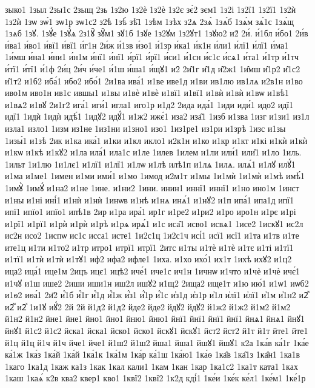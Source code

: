 {зыко1
1зыл
2зы1с
2зыщ
2зь
1з2ю
1з2ѐ
1з2ѐ
1з2є
зє́2
зєм1
1з2і
1з2ї1
1з2ї1
1з2ѝ
1з2ѝ
1зѡ
зѡ́1
зѡ1р
зѡ1с2
з2ѣ
1зѣ̀
зѣ̑1
1зѣм
1зѣх
з2ѧ
2зѧ̀
1зѧ́б
1зѧ́м
зѧ́1с
1зѧ́щ
1зѧб
1зꙋ.
1зꙋ́е
1зꙋ́ѧ
2з1ꙋ̑
зꙋ̑м1
зꙋ1б
1зꙋе
1з2ꙋм
1з2ꙋт1
1зꙋю2
и2́
2и́.
и́1бл
и́бо1
2и́в
и́ва1
и́во1
и́вї1
и́вї1
и́г1н
2и́ж
и́1зв
и́зо1
и́1зр
и́ка1
и́к1н
и́ли1
и́лї1
и́лї1
и́ма1
1и́мш
и́на1
и́ни1
и́н1м
и́нї1
и́нї1
и́рї1
и́рї1
и́си1
и́1сн
и́с1с
и́сѧ1
и́та1
и́1тр
и́1тч
и́тї1
и́тї1
и́1ф
2и́ц
2и́ч
и́че1
и́1ш
и́ша1
и́щꙋ1
и2̑
2и̑1г
и̑1д
и̑2ж1
1и̑мш
и̑1р2
и̑1с2
и̑1т2
и1б2
иба́1
ибо2
ибо́1
2и1ва
ива́1
и1ве
иве1д
и1ви
ив1лю
ив1лѧ
и2в1н
и1во
иво1м
иво1н
ив1с
ившы1
и1вы
и1вѐ
и1вѐ
и1вї1
и1вї1
и1вѝ
и1вѝ
и1вѡ
и1вѣ1
и1вѧ2
и1вꙋ
2и1г2
ига́1
иги́1
игла1
иго1р
и1д2
2ида
ида́1
1иди
иди́1
идо2
идї1
идї1
1идѝ
1идѝ
идѣ́1
1идꙋ2
идꙋ́1
и1ж2
ижє́1
иза2
иза̑1
1изб
и1зва
1изг
и1зи1
из1л
изла1
изло1
1изм
из1не
1из1ни
и1зно1
изо1
1из1ре1
из1ри
и1зрѣ
1изс
и1зы
1изы́1
и1зѣ
2ик
и1ка
ика́1
и1ки
и1кл
икло1
и2к1н
и1ко
и1кр
и1кт
и1кі
и1кѝ
и1кѝ
и1кѡ
и1кѣ
и1кꙋ2
и1ла
ила́1
ила1с
и1ле
1илев
1илем
и1ли
или́1
или̑1
и1ло
1иль.
1ильт
1и1лю
1и1лє1
и1лї1
и1лї1
и1лѡ
и1лѣ
илѣ1п
и1лѧ
1илѧ.
илѧ́1
и1лꙋ
илꙋ́1
и1ма
и1ме1
1имен
и1ми
ими́1
и1мо
1имод
и2м1т
и1мы
1и1мѝ
1и1мѝ
и1мѣ
имѣ́1
1имꙋ̀
1имꙋ́
и1на2
и1не
1ине.
и1ни2
1ини.
инин1
иннї1
иннї1
и1но
ино1м
1инст
и1ны
и1ні
ині́1
и1нѝ
и1нѝ
1инѡв
и1нѣ
и1нѧ
инѧ́1
и1нꙋ2
и1п
ипа́1
ипа1д
ипї1
ипї1
ипїо1
ипїо1
ипѣ1в
2ир
и1ра
ира́1
ир1г
и1ре2
и1ри2
и1ро
иро1н
и1рє
и1рі
и1рї1
и1рї1
и1рѝ
и1рѝ
и1рѣ
и1рѧ
ирѧ́1
и1с
иса̑1
исво1
исвѧ1
1исе2
1искꙋ1
ис2л
ис2н
исо2
1испѡ
ис1с
исса1
исте1
1и2с1ц
1и2с1ч
исі́1
исї1
исї1
и1та
и1тв
и1те
ите1ц
и1ти
и1то2
и1тр
итро1
итрї1
итрї1
2итс
и1ты
и1тѐ
и1тѐ
и1тє
и1ті
и1тї1
и1тї1
и1тѝ
и1тѝ
и1тꙋ1
иф2
ифа2
ифле1
1иха.
и1хо
ихо́1
их1т
1ихѣ
ихꙋ2
и1ц2
ица2
ица́1
ице1м
2ицъ
ицє1
ицѣ2
иче́1
иче1с
ич1н
1ичнѡ
и1что
и1чѐ
и1чѐ
ичє́1
и1чꙋ
и1ш
ише2
2иши
иши1н
иш2л
ишꙋ2
и1щ2
2ища2
ище1т
и1ю
ию́1
и1ѡ1
иѡб2
и1ѳ2
иѳа́1
2и҃2
и҆́1б
и҆́1г
и҆́1д
и҆́1ж
и҆́з1
и҆́1р
и҆́1с
и҆з1д
и҆з1р
и҆1л
и҆лї1
и҆лї1
и҆1м
и҆1н2
и2ⷤ
и2ⷨ
и2ⷯ
1и1ꙋ
иꙋ́2
2й
2й
й1д2
й1д2
йде2
йде2
йдꙋ2
йдꙋ2
й1ж2
й1ж2
й1м2
й1м2
й1н2
й1н2
йне1
йне1
йно1
йно1
йню1
йню1
йнї1
йнї1
йнї1
йнї1
йнѧ1
йнѧ1
йнꙋ1
йнꙋ1
й1с2
й1с2
йска1
йска1
йско1
йско1
йскꙋ1
йскꙋ1
йст2
йст2
й1т
й1т
йте1
йте1
й1ц
й1ц
й1ч
й1ч
йче1
йче1
й1ш2
й1ш2
йша1
йша1
йшꙋ1
йшꙋ1
к2а
1ка́в
ка́1г
1ка́е
ка́1ж
1ка́з
1ка́й
1ка́й
1ка́1к
1ка́1м
1ка́р
ка́1ш
1ка́ю1
1ка́ѳ
1ка̑в
1ка̑1з
1ка̑н1
1ка1в
1каго
1ка1д
1каж
ка1з
1как
1кал
кали1
1кам
1кан
1кар
1ка1с2
1ка1т
ката1
1ках
1каш
1каѧ́
к2в
ква2
квер1
кво1
1квї2
1квї2
1к2д
кді́1
1ке́и
1ке́к
ке́л1
1ке́м1
1ке́1р
}
